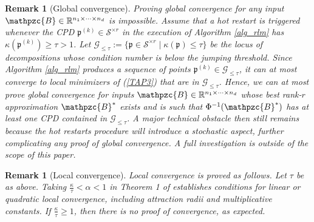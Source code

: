 \documentclass[a4paper,10pt,final]{siamart1116}
\newcommand{\tuple}[1]{\mathfrak{#1}}
\newcommand{\Var}[1]{\mathcal{#1}}
\newcommand{\tensor}[1]{\mathpzc{#1}}
\newcommand{\R}{\mathbb{R}}
\newcommand{\refeqn}[1]{{(\ref{#1})}}
\newcommand{\refalg}[1]{Algorithm \ref{#1}}
\newtheorem{remark}[theorem]{Remark}
\numberwithin{equation}{section}
\numberwithin{figure}{section}
\numberwithin{table}{section}
\numberwithin{theorem}{section}
\begin{document}
\begin{remark}[Global convergence]
Proving global convergence for any input $\tensor{B} \in \R^{n_1 \times \cdots \times n_d}$ is impossible.
Assume that a hot restart is triggered whenever the CPD $\tuple{p}^{(k)} \in \Var{S}^{\times r}$ in the execution of \refalg{alg_rlm} has $\kappa(\tuple{p}^{(k)}) \ge \tau > 1$. Let $\Var{G}_{\le \tau} := \{ \tuple{p}\in\Var{S}^{\times r} \;|\; \kappa(\tuple{p}) \le \tau \}$ be the locus of decompositions whose condition number is below the jumping threshold. Since \refalg{alg_rlm} produces a sequence of points $\tuple{p}^{(k)} \in \Var{G}_{\le \tau}$, it can at most converge to local minimizers of \refeqn{TAP3} that are in $\Var{G}_{\le \tau}$. Hence, we can at most prove global convergence for inputs $\tensor{B} \in \R^{n_1 \times \cdots \times n_d}$ whose best rank-$r$ approximation $\tensor{B}^*$ exists and is such that $\Phi^{-1}(\tensor{B}^*)$ has at least one CPD contained in $\Var{G}_{\le \tau}$. A major technical obstacle then still remains because the hot restarts procedure will introduce a stochastic aspect, further complicating any proof of global convergence. A full investigation is outside of the scope of this paper.
\end{remark}

\begin{remark}[Local convergence]
Local convergence is proved as follows. Let $\tau$ be as above. Taking $\frac{\kappa}{\tau} < \alpha < 1$ in Theorem 1 of \cite{BV2017bis} establishes conditions for linear or quadratic local convergence, including attraction radii and multiplicative constants. If $\frac{\kappa}{\tau} \ge 1$, then there is no proof of convergence, as expected.
\end{remark}
\end{document}
